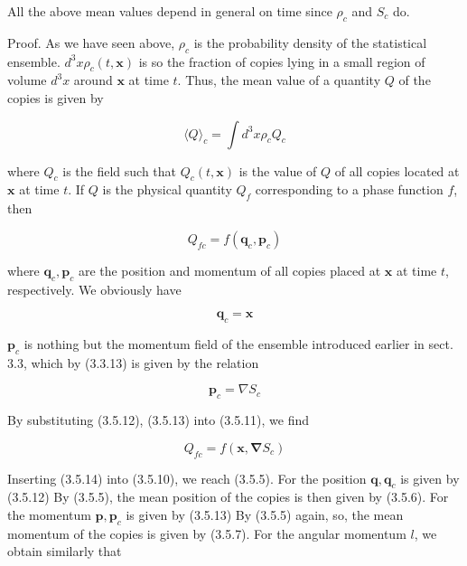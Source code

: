 \documentclass{article}
\begin{document}
All the above mean values depend in general on time since $\rho_{c}$ and $S_{c}$ do.

Proof. As we have seen above, $\rho_{c}$ is the probability density of the statistical ensemble. $d^{3} x \rho_{c}(t, \boldsymbol{x})$ is so the fraction of copies lying in a small region of volume $d^{3} x$ around $\boldsymbol{x}$ at time $t$. Thus, the mean value of a quantity $Q$ of the copies is given by
 
\begin{equation*}
\langle Q\rangle_{c}=\int d^{3} x \rho_{c} Q_{c} \tag{3.5.10}
\end{equation*}
 
where $Q_{c}$ is the field such that $Q_{c}(t, \boldsymbol{x})$ is the value of $Q$ of all copies located at $\boldsymbol{x}$ at time $t$. If $Q$ is the physical quantity $Q_{f}$ corresponding to a phase function $f$, then
 
\begin{equation*}
Q_{f c}=f\left(\boldsymbol{q}_{c}, \boldsymbol{p}_{c}\right) \tag{3.5.11}
\end{equation*}
 
where $\boldsymbol{q}_{c}, \boldsymbol{p}_{c}$ are the position and momentum of all copies placed at $\boldsymbol{x}$ at time $t$, respectively. We obviously have
 
\begin{equation*}
\boldsymbol{q}_{c}=\boldsymbol{x} \tag{3.5.12}
\end{equation*}
 
$\boldsymbol{p}_{c}$ is nothing but the momentum field of the ensemble introduced earlier in sect. 3.3, which by (3.3.13) is given by the relation
 
\begin{equation*}
\boldsymbol{p}_{c}=\nabla S_{c} \tag{3.5.13}
\end{equation*}
 

By substituting (3.5.12), (3.5.13) into (3.5.11), we find
 
\begin{equation*}
Q_{f c}=f\left(\boldsymbol{x}, \boldsymbol{\nabla} S_{c}\right) \tag{3.5.14}
\end{equation*}
 

Inserting (3.5.14) into (3.5.10), we reach (3.5.5).
For the position $\boldsymbol{q}, \boldsymbol{q}_{c}$ is given by (3.5.12) By (3.5.5), the mean position of the copies is then given by (3.5.6). For the momentum $\boldsymbol{p}, \boldsymbol{p}_{c}$ is given by (3.5.13) By (3.5.5) again, so, the mean momentum of the copies is given by (3.5.7). For the angular momentum $l$, we obtain similarly that
 
\end{document}
